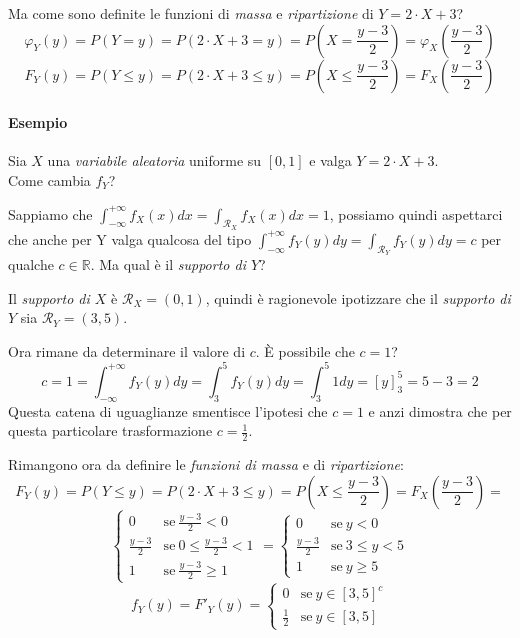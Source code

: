 \documentclass[12pt, a4paper]{report}
\theoremstyle{definition}
\DeclareRobustCommand{\R}{\mathbb{R}}%
\DeclareRobustCommand{\supp}{\mathcal{R}}%
\begin{document}
Ma come sono definite le funzioni di \emph{massa} e \emph{ripartizione} di
$Y=2\cdot X+3$?
\[\varphi_Y(y)=P(Y=y)=P(2\cdot X+3=y)=P\left(X=\frac{y-3}{2}\right)=\varphi_X\left(
\frac{y-3}{2}\right)\]
\[F_Y(y)=P(Y\leq y)=P(2\cdot X+3\leq y)=P\left(X\leq \frac{y-3}{2}\right)=F_X\left(
\frac{y-3}{2}\right)\]

\newpage
\paragraph*{Esempio}
Sia $X$ una \emph{variabile aleatoria} uniforme su $[0,1]$ e valga \(Y=2\cdot X+3\).\\
Come cambia $f_Y$?

Sappiamo che \(\int_{-\infty}^{+\infty}f_X(x)dx=\int_{\supp_X}f_X(x)dx=1\),
possiamo quindi aspettarci che anche per Y valga qualcosa del tipo
\(\int_{-\infty}^{+\infty}f_Y(y)dy=\int_{\supp_Y}f_Y(y)dy=c\) per qualche $c\in\R$.
Ma qual è il \emph{supporto di $Y$}?

Il \emph{supporto di $X$} è \(\supp_X=(0,1)\), quindi è ragionevole ipotizzare
che il \emph{supporto di $Y$} sia \(\supp_Y=(3,5)\).

Ora rimane da determinare il valore di $c$. È possibile che $c=1$?
\[c=1=\int_{-\infty}^{+\infty}f_Y(y)dy=\int_{3}^{5}f_Y(y)dy=\int_{3}^{5}1dy=
[y]_{3}^{5}=5-3=2\]
Questa catena di uguaglianze smentisce l'ipotesi che $c=1$ e anzi dimostra
che per questa particolare trasformazione $c=\frac{1}{2}$.

Rimangono ora da definire le \emph{funzioni di massa} e di \emph{ripartizione}:
\[F_Y(y)=P(Y\leq y)=P(2\cdot X+3\leq y)=P\left(X\leq\frac{y-3}{2}\right)=F_X\left(
\frac{y-3}{2}\right)=\]
\[\begin{cases}
	{0} & \text{se}\ {\frac{y-3}{2}<0}\\
	{\frac{y-3}{2}} & \text{se}\ {0\leq\frac{y-3}{2}<1}\\
	{1} & \text{se}\ {\frac{y-3}{2}\geq 1}
\end{cases}=\begin{cases}
	{0} & \text{se}\ {y<0}\\
	{\frac{y-3}{2}} & \text{se}\ {3\leq y<5}\\
	{1} & \text{se}\ {y\geq 5}	
\end{cases}\]
\[f_Y(y)=F'_Y(y)=\begin{cases}
	{0} & \text{se}\ {y\in[3,5]^c}\\
	{\frac{1}{2}} & \text{se}\ {y\in[3,5]}
\end{cases}\]
\end{document}
